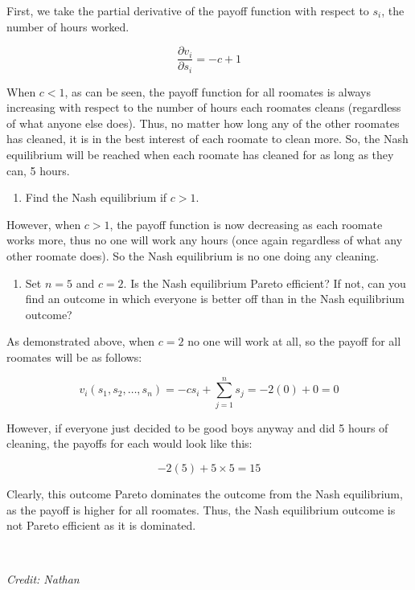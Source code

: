 \documentclass{article}
\begin{document}
\begin{enumerate}
          First, we take the partial derivative of the payoff function with respect to $s_i$, the number of hours worked.

          \[\frac{\partial v_i}{\partial s_i} = -c + 1\]

          When $c < 1$, as can be seen, the payoff function for all roomates is always increasing with respect to the number of hours each roomates cleans (regardless of what anyone else does). Thus, no matter how long any of the other roomates has cleaned, it is in the best interest of each roomate to clean more. So, the Nash equilibrium will be reached when each roomate has cleaned for as long as they can, 5 hours.

          \begin{enumerate}[resume]
              \item Find the Nash equilibrium if $c > 1$.
          \end{enumerate}

          However, when $c > 1$, the payoff function is now decreasing as each roomate works more, thus no one will work any hours (once again regardless of what any other roomate does). So the Nash equilibrium is no one doing any cleaning.

          \begin{enumerate}[resume]
              \item Set $n = 5$ and $c = 2$. Is the Nash equilibrium Pareto efficient? If not, can you find an outcome in which everyone is better off than in the Nash equilibrium outcome?
          \end{enumerate}

          As demonstrated above, when $c = 2$ no one will work at all, so the payoff for all roomates will be as follows:

          \[
              v_i(s_1, s_2, \dots, s_n) = -cs_i + \sum_{j=1}^{n} s_j = -2(0) + 0 = 0
          \]

          However, if everyone just decided to be good boys anyway and did 5 hours of cleaning, the payoffs for each would look like this:

          \[
              -2(5) + 5 \times 5 = 15
          \]

          Clearly, this outcome Pareto dominates the outcome from the Nash equilibrium, as the payoff is higher for all roomates. Thus, the Nash equilibrium outcome is not Pareto efficient as it is dominated.

          \,

          \textit{Credit: Nathan}
\end{enumerate}
\end{document}
